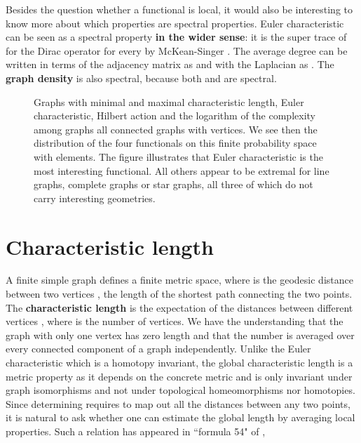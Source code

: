 \documentclass[12pt]{amsart}
\theoremstyle{definition}
\begin{document}
Besides the question whether a functional is local,
it would also be interesting to know more about which properties are spectral properties. 
Euler characteristic can be seen as a spectral property {\bf in the wider sense}:  
it is the super trace of  for the Dirac operator  for every  by 
McKean-Singer \cite{knillmckeansinger}. 
The average degree  can be written in terms of the adjacency matrix  as 
 and
with the Laplacian  as . The {\bf graph density}
 is also spectral, because both  and  are spectral.

\begin{figure}
\parbox{15.4cm}{
\parbox{15cm}{}
\parbox{15cm}{}
\parbox{15cm}{}
}
\caption{
Graphs with minimal and maximal characteristic length, 
Euler characteristic, Hilbert action and the logarithm of the complexity among graphs all
connected graphs with  vertices. We see then the distribution of the four functionals
on this finite probability space with  elements. The figure illustrates that
Euler characteristic is the most interesting functional. All others appear to be extremal for
line graphs, complete graphs or star graphs, all three of which do not carry 
interesting geometries. 
}
\label{extrema}
\end{figure}

\section{Characteristic length}

A finite simple graph  defines a finite metric space, where
 is the geodesic distance between two vertices , the length of the shortest
path connecting the two points. The {\bf characteristic length}  is the expectation
of the distances between different vertices
,
where  is the number of vertices. We have the understanding that the graph 
with only one vertex has zero length  and that the number  is averaged over every connected
component of a graph independently. Unlike the Euler characteristic which 
is a homotopy invariant, the global characteristic length is a metric property as
it  depends on the concrete metric and is only invariant under graph isomorphisms and not under topological 
homeomorphisms \cite{KnillTopology} nor homotopies. Since determining
 requires to map out all the distances between any two points, it is natural to ask whether
one can estimate the global length by averaging local properties. Such a relation
has appeared in ``formula 54" of \cite{NewmanStrogatzWatts},
 
\end{document}
